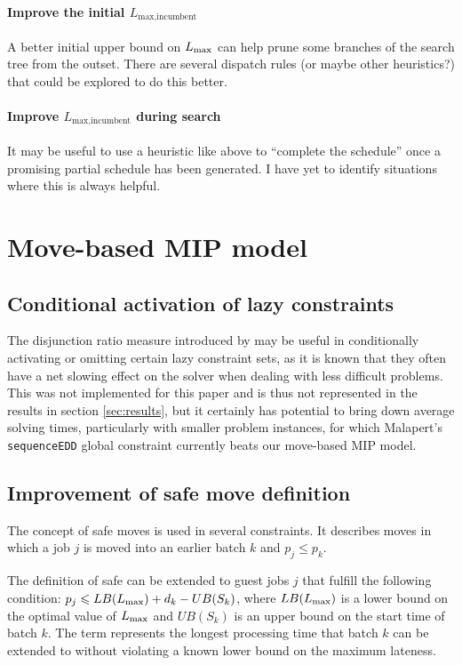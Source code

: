 \documentclass[13pt, letterpaper, oneside]{book}
\begin{document}
\paragraph{Improve the initial $L_{\text{max,incumbent}}$} A better initial
upper bound on $L_{\text{max}}$ can help prune some branches of the search tree from the
outset. There are several dispatch rules (or maybe other heuristics?) that could
be explored to do this better.
\paragraph{Improve $L_{\text{max,incumbent}}$ during search} It may be useful to
use a heuristic like above to ``complete the schedule'' once a promising partial
schedule has been generated. I have yet to identify situations where this is
always helpful.


\section{Move-based MIP model}
\subsection{Conditional activation of lazy constraints}
The disjunction ratio measure introduced by \citet{baptistelepape} may be useful
in conditionally activating or omitting certain lazy constraint sets, as it is
known that they often have a net slowing effect on the solver when dealing with
less difficult problems. This was not implemented for this paper and is thus not
represented in the results in section \ref{sec:results}, but it certainly has
potential to bring down average solving times, particularly with smaller problem
instances, for which Malapert's \texttt{sequenceEDD} global constraint currently
beats our move-based MIP model.

\subsection[Improvement of \textit{safe move} definition]{Improvement of {\sansitalicfont safe move} definition}
The concept of safe moves is used in several constraints. It describes moves
in which a job $j$ is moved into an earlier batch $k$ and $p_j \leq p_k$.

The definition of safe can be extended to guest jobs $j$ that fulfill the
following condition: $p_j \leqslant LB(L_{\text{max}}) + d_k - UB(S_k)$, where $LB(L_{\text{max}})$ is
a lower bound on the optimal value of $L_{\text{max}}$ and $UB(S_k)$ is an upper bound on
the start time of batch $k$. The term represents the longest processing time
that batch $k$ can be extended to without violating a known lower bound on the
maximum lateness.
\end{document}
